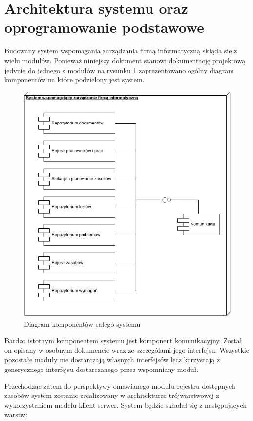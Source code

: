 \section{Architektura systemu oraz oprogramowanie podstawowe}

Budowany system wspomagania zarządzania firmą informatyczną skłąda sie
z wielu modułów. Ponieważ niniejszy dokument stanowi dokumentację
projektową jedynie do jednego z modułów na rysunku \ref{fig:labelArchOgol}
zaprezentowano ogólny diagram komponentów na które podzielony jest system.

\begin{figure}[h]
	\centering
	\includegraphics[width=\textwidth]{img/archogol}
	\caption{Diagram komponentów całego systemu\label{fig:labelArchOgol}}
\end{figure}

Bardzo istotnym komponentem systemu jest komponent
komunikacyjny. Został on opisany w osobnym dokumencie wraz ze
szczególami jego interfejsu. Wszystkie pozostałe moduły nie
dostarczają własnych interfejsów lecz korzystają z generycznego
interfejsu dostarczanego przez wspomniany moduł.

Przechodząc zatem do perspektywy omawianego modułu rejestru dostępnych
zasobów system zostanie zrealizowany w architekturze trójwarstwowej z
wykorzystaniem modelu klient-serwer. System będzie składał się z
następujących warstw:

